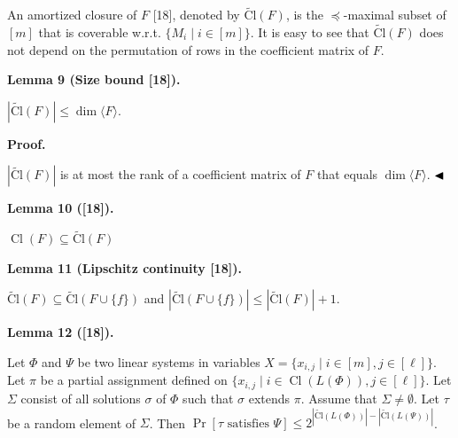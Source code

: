 \documentclass[10pt,a4paper]{article}
\begin{document}
An amortized closure of $F$ [18], denoted by $\operatorname{\widetilde{Cl}}(F)$, is the $\preceq$-maximal
subset of $[m]$ that is coverable w.r.t. $\{M_{i}\mid i\in[m]\}$.
It is easy to see that $\operatorname{\widetilde{Cl}}(F)$ does not depend on the permutation of rows in the coefficient
matrix of $F$.\par



\par\medskip\noindent\textbf{
Lemma 9 (Size bound [18]).
}\par



$|\operatorname{\widetilde{Cl}}(F)|\leq\dim\langle F\rangle$.\par



\par\medskip\noindent\textbf{Proof.}\par


$|\operatorname{\widetilde{Cl}}(F)|$ is at most the rank of a coefficient matrix of $F$ that equals $\dim\langle F\rangle$.
$\hfill\blacktriangleleft$\par



\par\medskip\noindent\textbf{
Lemma 10 ([18]).
}\par



$\operatorname{Cl}(F)\subseteq\operatorname{\widetilde{Cl}}(F)$\par




\par\medskip\noindent\textbf{
Lemma 11 (Lipschitz continuity [18]).
}\par



$\operatorname{\widetilde{Cl}}(F)\subseteq\operatorname{\widetilde{Cl}}(F\cup\{f\})$ and $|\operatorname{\widetilde{Cl}}(F\cup\{f\})|\leq|\operatorname{\widetilde{Cl}}(F)|+1$.\par




\par\medskip\noindent\textbf{
Lemma 12 ([18]).
}\par



Let $\Phi$ and $\Psi$ be two linear systems in variables $X=\{x_{i,j}\mid i\in[m],j\in[\ell]\}$.
Let $\pi$ be a partial assignment defined on $\{x_{i,j}\mid i\in\operatorname{Cl}(L(\Phi)),j\in[\ell]\}$.
Let $\Sigma$ consist of all solutions $\sigma$ of $\Phi$ such that $\sigma$ extends $\pi$.
Assume that $\Sigma\neq\emptyset$.
Let $\tau$ be a random element of $\Sigma$.
Then $\Pr[\tau\mbox{ satisfies }\Psi]\leq 2^{|\operatorname{\widetilde{Cl}}(L(\Phi))|-|\operatorname{\widetilde{Cl}}(L(\Psi))|}$.\par
\end{document}

